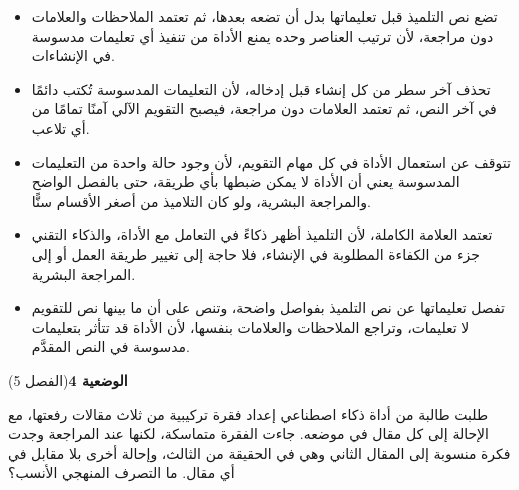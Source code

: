 \documentclass[11pt,a4paper]{article}
\begin{document}
\begin{itemize}[leftmargin=1.0cm, labelsep=6pt, itemsep=3pt, topsep=4pt, parsep=0pt]
  \item[\textbf{أ)}] تضع نص التلميذ قبل تعليماتها بدل أن تضعه بعدها، ثم تعتمد الملاحظات والعلامات دون مراجعة، لأن ترتيب العناصر وحده يمنع الأداة من تنفيذ أي تعليمات مدسوسة في الإنشاءات.
  \item[\textbf{ب)}] تحذف آخر سطر من كل إنشاء قبل إدخاله، لأن التعليمات المدسوسة تُكتب دائمًا في آخر النص، ثم تعتمد العلامات دون مراجعة، فيصبح التقويم الآلي آمنًا تمامًا من أي تلاعب.
  \item[\textbf{ج)}] تتوقف عن استعمال الأداة في كل مهام التقويم، لأن وجود حالة واحدة من التعليمات المدسوسة يعني أن الأداة لا يمكن ضبطها بأي طريقة، حتى بالفصل الواضح والمراجعة البشرية، ولو كان التلاميذ من أصغر الأقسام سنًّا.
  \item[\textbf{د)}] تعتمد العلامة الكاملة، لأن التلميذ أظهر ذكاءً في التعامل مع الأداة، والذكاء التقني جزء من الكفاءة المطلوبة في الإنشاء، فلا حاجة إلى تغيير طريقة العمل أو إلى المراجعة البشرية.
  \item[\textbf{هـ)}] تفصل تعليماتها عن نص التلميذ بفواصل واضحة، وتنص على أن ما بينها نص للتقويم لا تعليمات، وتراجع الملاحظات والعلامات بنفسها، لأن الأداة قد تتأثر بتعليمات مدسوسة في النص المقدَّم.
\end{itemize}
\par\vspace{6pt}
\noindent
{\large\khatt\textbf{الوضعية 4}}\hfill{\small(الفصل 5)}\par\nopagebreak\vspace{3pt}
\setlength{\fboxsep}{7pt}\colorbox{gray!10}{\parbox{\dimexpr\linewidth-14pt}{طلبت طالبة من أداة ذكاء اصطناعي إعداد فقرة تركيبية من ثلاث مقالات رفعتها، مع الإحالة إلى كل مقال في موضعه. جاءت الفقرة متماسكة، لكنها عند المراجعة وجدت فكرة منسوبة إلى المقال الثاني وهي في الحقيقة من الثالث، وإحالة أخرى بلا مقابل في أي مقال. ما التصرف المنهجي الأنسب؟}}\par\nopagebreak
\end{document}
